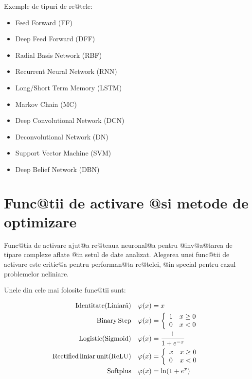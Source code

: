 Exemple de tipuri de re@tele:

\begin{itemize}
	\item Feed Forward (FF)
	\item Deep Feed Forward (DFF)
	\item Radial Basis Network (RBF)
	\item Recurrent Neural Network (RNN)
	\item Long/Short Term Memory (LSTM)
	\item Markov Chain (MC)
	\item Deep Convolutional Network (DCN)
	\item Deconvolutional Network (DN)
	\item Support Vector Machine (SVM)
	\item Deep Belief Network (DBN)
\end{itemize}



\section{Func@tii de activare @si metode de optimizare}

Func@tia de activare ajut@a re@teaua neuronal@a pentru @inv@a@tarea de tipare complexe aflate @in setul de date analizat. Alegerea unei func@tii de activare este critic@a pentru performan@ta re@telei, @in special pentru cazul problemelor neliniare.

Unele din cele mai folosite func@tii sunt:

\begin{align}
	{\rm Identitate (Liniar\check{a})} \quad \varphi (x) &= x \label{eq:liniar} \\
	{\rm Binary \, Step} \quad \varphi (x) &= \left\lbrace
		\begin{array}{lc}
			1 & x \geq 0 \\
			0 & x < 0
		\end{array}
	\right. \\
	{\rm Logistic (Sigmoid)} \quad \varphi (x) &= \displaystyle\frac{1}{1 + e^{-x}} \\
	{\rm Rectified\, liniar\, unit (ReLU)} \quad \varphi (x) &= \left\lbrace
		\begin{array}{lc}
			x & x \geq 0 \\
			0 & x < 0
		\end{array}
	\right. \label{eq:relu} \\
	{\rm Softplus} \quad \varphi (x) &= \ln ( 1 + e^x) 
\end{align}

